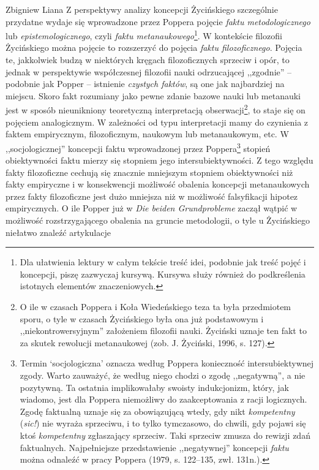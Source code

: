 \begin{artplenv}{Zbigniew Liana}
Z perspektywy analizy koncepcji Życińskiego szczególnie przydatne wydaje się wprowadzone przez Poppera pojęcie
\textit{faktu metodologicznego} lub \textit{epistemologicznego}, czyli \textit{faktu metanaukowego}\footnote{Dla ułatwienia
	lektury w całym tekście treść idei, podobnie jak treść pojęć i koncepcji, piszę zazwyczaj kursywą. Kursywa służy
	również do podkreślenia istotnych elementów znaczeniowych.}. W kontekście filozofii Życińskiego można pojęcie to
rozszerzyć do pojęcia \textit{faktu filozoficznego}. Pojęcia te, jakkolwiek budzą w niektórych kręgach filozoficznych
sprzeciw i opór, to jednak w perspektywie współczesnej filozofii nauki odrzucającej ,,zgodnie'' -- podobnie jak Popper –
istnienie \textit{czystych faktów}, są one jak najbardziej na miejscu. Skoro fakt rozumiany jako pewne zdanie bazowe
nauki lub metanauki jest w sposób nieunikniony teoretyczną interpretacją obserwacji\footnote{O ile w czasach Poppera i
	Koła Wiedeńskiego teza ta była przedmiotem sporu, o tyle w czasach Życińskiego była ona już podstawowym i
	,,niekontrowersyjnym'' założeniem filozofii nauki. Życiński uznaje ten fakt to za skutek rewolucji metanaukowej
	\label{ref:RNDNNdGM9DYkK}(zob. J. Życiński, 1996, s. 127).}, to staje się on pojęciem analogicznym. W zależności od
typu interpretacji mamy do czynienia z faktem empirycznym, filozoficznym, naukowym lub metanaukowym, etc. W
,,socjologicznej'' koncepcji faktu wprowadzonej przez Poppera\footnote{Termin ‘socjologiczna’ oznacza według Poppera
	konieczność intersubiektywnej zgody. Warto zauważyć, że według niego chodzi o zgodę ,,negatywną'', a nie pozytywną. Ta
	ostatnia implikowałaby swoisty indukcjonizm, który, jak wiadomo, jest dla Poppera niemożliwy do zaakceptowania z racji
	logicznych. Zgodę faktualną uznaje się za obowiązującą wtedy, gdy nikt \textit{kompetentny} (\textit{sic!}) nie wyraża
	sprzeciwu, i to tylko tymczasowo, do chwili, gdy pojawi się ktoś \textit{kompetentny} zgłaszający sprzeciw. Taki sprzeciw
	zmusza do rewizji zdań faktualnych. Najpełniejsze przedstawienie ,,negatywnej'' koncepcji \textit{faktu} można odnaleźć w
	pracy Poppera \label{ref:RNDFSE3yxffmO}(1979, s. 122–135, zwł. 131n.).} stopień obiektywności faktu mierzy się stopniem
jego intersubiektywności. Z tego względu fakty filozoficzne cechują się znacznie mniejszym stopniem obiektywności niż
fakty empiryczne i w konsekwencji możliwość obalenia koncepcji metanaukowych przez fakty filozoficzne jest dużo
mniejsza niż w możliwość falsyfikacji hipotez empirycznych. O ile Popper już w \textit{Die beiden Grundprobleme} zaczął
wątpić w możliwość rozstrzygającego obalenia na gruncie metodologii, o tyle u Życińskiego niełatwo znaleźć artykulacje

\end{artplenv}

